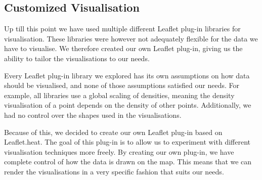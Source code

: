 \subsection{Customized Visualisation}\label{sec:own_leaflet_plugin}

Up till this point we have used multiple different Leaflet plug-in libraries for visualisation. These libraries were however not adequately flexible for the data we have to visualise. We therefore created our own Leaflet plug-in, giving us the ability to tailor the visualisations to our needs.

Every Leaflet plug-in library we explored has its own assumptions on how data should be visualised, and none of those assumptions satisfied our needs. For example, all libraries use a global scaling of densities, meaning the density visualisation of a point depends on the density of other points. Additionally, we had no control over the shapes used in the visualisations.

Because of this, we decided to create our own Leaflet plug-in based on Leaflet.heat. The goal of this plug-in is to allow us to experiment with different visualisation techniques more freely. By creating our own plug-in, we have complete control of how the data is drawn on the map. This means that we can render the visualisations in a very specific fashion that suits our needs.